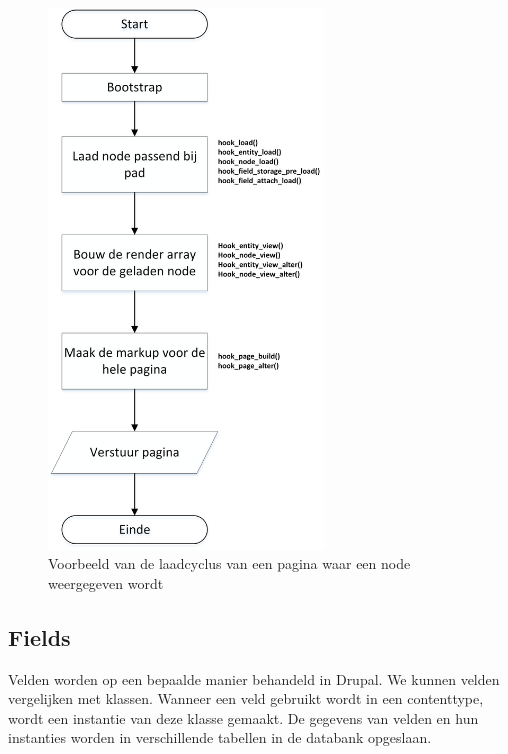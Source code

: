 \begin{figure}
\centering
\hspace{55pt}
\includegraphics[width=0.65\textwidth]{fig/pageCallback}
\hspace{-50pt}
\caption{Voorbeeld van de laadcyclus van een pagina waar een node weergegeven wordt}
\label{fig:drupalPageCallback}
\end{figure}

\newpage

\subsection{Fields}\label{Fields}
Velden worden op een bepaalde manier behandeld in Drupal. We kunnen velden vergelijken met klassen. Wanneer een veld gebruikt wordt in een contenttype, wordt een instantie van deze klasse gemaakt. De gegevens van velden en hun instanties worden in verschillende tabellen in de databank opgeslaan.
